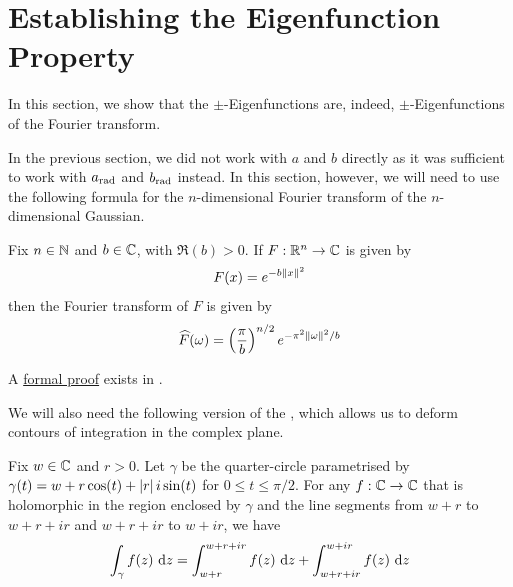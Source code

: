 \section{Establishing the Eigenfunction Property}


In this section, we show that the $\pm$-Eigenfunctions are, indeed, $\pm$-Eigenfunctions of the Fourier transform.

In the previous section, we did not work with $a$ and $b$ directly as it was sufficient to work with $a_{\operatorname{rad}}$ and $b_{\operatorname{rad}}$ instead. In this section, however, we will need to use the following formula for the $n$-dimensional Fourier transform of the $n$-dimensional Gaussian.

\begin{boxtheorem}\label{Ch4:Thm:GaussianFourier}
    Fix $n \in \mathbb{N}$ and $b \in \mathbb{C}$, with $\Re(b) > 0$. If $F : \mathbb{R}^n \to \mathbb{C}$ is given by
    \begin{align*}
        F(x) = e^{-b \left\lVert x \right\rVert^2}
    \end{align*}
    then the Fourier transform of $F$ is given by
    \begin{align*}
        \widehat{F}\!\left( \omega \right) = \left( \frac{\pi}{b} \right)^{{n} / {2}} e^{{- \pi^2 \left\lVert \omega \right\rVert^2} / {b}}
    \end{align*}
\end{boxtheorem}
A \href{https://github.com/leanprover-community/mathlib4/blob/5a2eaa85c555c4263e15928cef249cbaad2eb2d2/Mathlib/Analysis/SpecialFunctions/Gaussian/FourierTransform.lean#L360-L363}{formal proof} exists in \mathlib.

We will also need the following version of the \CGT, which allows us to deform contours of integration in the complex plane.

\begin{boxtheorem}\label{Ch4:Thm:CGTRectCircle}
    Fix $w \in \mathbb{C}$ and $r > 0$. Let $\gamma$ be the quarter-circle parametrised by $\gamma(t) = w + r\cos\!{\left( t \right)} + \left\lvert r \right\rvert i \sin\!{\left( t \right)}$ for $0 \leq t \leq \pi/2$. For any $f : \mathbb{C} \to \mathbb{C}$ that is holomorphic in the region enclosed by $\gamma$ and the line segments from $w + r$ to $w + r + ir$ and $w + r + ir$ to $w + ir$, we have
    \begin{align*}
        \int_{\gamma} f(z) \, \operatorname{d}\!{z}
        = \int_{w + r}^{w + r + ir} f(z) \, \operatorname{d}\!{z} + \int_{w + r + ir}^{w + ir} f(z) \, \operatorname{d}\!{z}
    \end{align*}
\end{boxtheorem}

